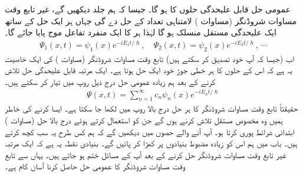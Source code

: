 \quad
عمومی حل قابل علیحدگی حلوں کا  ہو گا۔ جیسا کہ  ہم جلد دیکھیں گے، غیر تابع وقت مساوات شروڈنگر (مساوات ) لامتناہی تعداد کے حل  دے گی جہاں ہر ایک حل کے ساتھ ایک علیحدگی مستقل  منسلک ہو گا لہٰذا ہر  کا ایک منفرد تفاعل موج پایا جائے گا۔ 
\begin{align*}
\Psi_{1} (x,t) = \psi_{1}(x)e^{-iE_{1}t/\hslash} , \quad \Psi_{2} (x,t) = \psi_{2}(x)e^{-iE_{2}t/\hslash}, \, \cdots 
\end{align*}
اب (جیسا کہ آپ خود تصدیق کر سکتے ہیں) تابع وقت مساوات شروڈنگر (مساوات ) کی ایک خاصیت یہ ہے کہ اس کے حلوں کا ہر خطی جوڑ خود ایک حل ہوتا ہے۔ ایک مرتبہ  قابل علیحدگی حل تلاش کرنے کے بعد ہم زیادہ عمومی حل درج ذیل روپ میں تیار کر سکتے ہیں۔
\begin{align}\label{مساوات_شروڈنگر_خطی_جوڑ_عمومی_حل}
\Psi (x,t) = \sum_{n=1}^{\infty} c_{n} \psi_{n}(x)e^{-iE_{n}t/\hslash}
\end{align}
حقیقتاً تابع وقت مساوات شروڈنگر کا ہر حل درج بالا روپ میں لکھا جا سکتا ہے۔ ایسا کرنے کی خاطر ہمیں وہ مخصوص مستقل    تلاش کرنے ہوں گے جن کو استعمال کرتے ہوئے درج بالا حل (مساوات ) ابتدائی شرائط  پوری  کرتا ہو۔ آپ آنے والے حصوں میں دیکھیں گے کہ ہم کس طرح یہ سب کچھ کرتے  ہیں۔ باب  میں ہم اس کو زیادہ مضبوط بنیادوں پر کھڑا کر پائیں گے۔ بنیادی نقطہ یہ ہے کہ ایک  مرتبہ  غیر تابع وقت مساوات شروڈنگر حل کرنے کے بعد آپ کے مسائل ختم ہو جاتے ہیں۔ یہاں سے تابع وقت مساوات شروڈنگر کا عمومی حل حاصل کرنا آسان کام ہے۔ 

